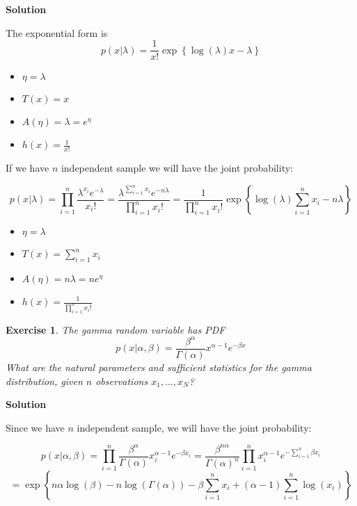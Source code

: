 \documentclass[twoside]{article}
\newcounter{lecnum}
\newtheorem{exercise}{Exercise}[lecnum]
\begin{document}
 \color{blue}
\textbf{Solution}


The exponential form is 
$$p(x|\lambda) = \frac{1}{x!} \exp\left\{\log\left( \lambda \right)x -\lambda  \right\} $$

\begin{itemize}
	\item $\eta = \lambda $
	\item $T(x) = x$
	\item $A(\eta) =  \lambda = e^{\eta}$
	\item $h(x)=  \frac{1}{x!} $
\end{itemize}

If we have $n$ independent sample we will have the joint probability:
 
 $$p(x|\lambda) = \prod_{i=1}^n \frac{\lambda^{x_i} e^{-\lambda}}{x_i!} = \frac{\lambda^{\sum_{i=1}^{n}x_i} e^{-n \lambda}}{\prod_{i=1}^n x_i!} 
 = \frac{1}{\prod_{i=1}^n x_i!} \exp\left\{\log\left( \lambda \right)\sum_{i=1}^{n}x_i -n \lambda  \right\} $$
 
 
 \begin{itemize}
 	\item $\eta = \lambda $
 	\item $T(x) =  \sum_{i=1}^{n}x_i $
 	\item $A(\eta) =  n \lambda = n e^{\eta}$
 	\item $h(x)=  \frac{1}{\prod_{i=1}^n x_i!} $
 \end{itemize}

 \color{black}
 \vspace{10mm}

\begin{exercise}
  The gamma random variable has PDF
  $$p(x|\alpha,\beta) = \frac{\beta^\alpha}{\Gamma(\alpha)}x^{\alpha-1}e^{-\beta x}$$
  What are the natural parameters and sufficient statistics for the gamma distribution, given $n$ observations $x_1,\dots, x_N$?
\end{exercise}

 \color{blue}
\textbf{Solution}

Since we have $n$ independent sample, we will have the joint probability:

$$p(x|\alpha,\beta) = \prod_{i=1}^n \frac{\beta^\alpha}{\Gamma(\alpha)}x_i^{\alpha-1}e^{-\beta x_i} 
=  \frac{\beta^{n \alpha}}{\Gamma(\alpha)^n} \prod_{i=1}^n x_i^{\alpha-1} e^{-\sum_{i=1}^{n}\beta x_i} $$
$$
=  \exp\left\{ n\alpha \log (\beta)  - n \log (\Gamma(\alpha)) -\beta \sum_{i=1}^{n} x_i  + (\alpha - 1)  \sum_{i=1}^{n} \log (x_i)  \right\}
$$
\end{document}

